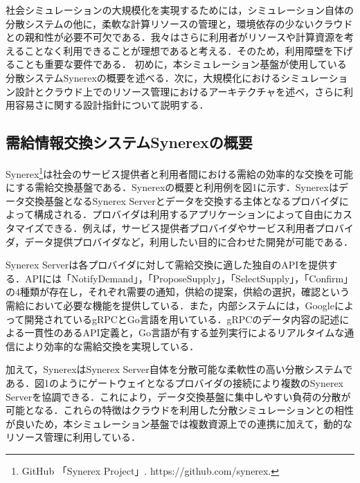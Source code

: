 \documentclass[originalpaper]{jsaiart}     %
\begin{document}



社会シミュレーションの大規模化を実現するためには，シミュレーション自体の分散システムの他に，柔軟な計算リソースの管理と，環境依存の少ないクラウドとの親和性が必要不可欠である．我々はさらに利用者がリソースや計算資源を考えることなく利用できることが理想であると考える．そのため，利用障壁を下げることも重要な要件である．
初めに，本シミュレーション基盤が使用している分散システムSynerexの概要を述べる．次に，大規模化におけるシミュレーション設計とクラウド上でのリソース管理におけるアーキテクチャを述べ，さらに利用容易さに関する設計指針について説明する．

\subsection{需給情報交換システムSynerexの概要}
Synerex\footnote{GitHub 「Synerex Project」. https://github.com/synerex.}\cite{Kawaguchi}は社会のサービス提供者と利用者間における需給の効率的な交換を可能にする需給交換基盤である．Synerexの概要と利用例を図1に示す．Synerexはデータ交換基盤となるSynerex Serverとデータを交換する主体となるプロバイダによって構成される．プロバイダは利用するアプリケーションによって自由にカスタマイズできる．例えば，サービス提供者プロバイダやサービス利用者プロバイダ，データ提供プロバイダなど，利用したい目的に合わせた開発が可能である．

Synerex Serverは各プロバイダに対して需給交換に適した独自のAPIを提供する．APIには「NotifyDemand」，「ProposeSupply」，「SelectSupply」，「Confirm」の4種類が存在し，それぞれ需要の通知，供給の提案，供給の選択，確認という需給において必要な機能を提供している．また，内部システムには，Googleによって開発されているgRPCとGo言語を用いている．gRPCのデータ内容の記述による一貫性のあるAPI定義と，Go言語が有する並列実行によるリアルタイムな通信により効率的な需給交換を実現している．

加えて，SynerexはSynerex Server自体を分散可能な柔軟性の高い分散システムである．図1のようにゲートウェイとなるプロバイダの接続により複数のSynerex Serverを協調できる．これにより，データ交換基盤に集中しやすい負荷の分散が可能となる．これらの特徴はクラウドを利用した分散シミュレーションとの相性が良いため，本シミュレーション基盤では複数資源上での連携に加えて，動的なリソース管理に利用している．
\end{document}
